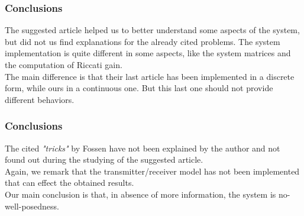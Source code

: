 \documentclass{beamer}
\begin{document}
		\begin{frame}
			\frametitle{Conclusions}
			The suggested article helped us to better understand some aspects of the system, but did not us find explanations for the already cited problems. The system implementation is quite different in some aspects, like the system matrices and the computation of Riccati gain.\\ The main difference is that their last article has been implemented in a discrete form, while ours in a continuous one. But this last one should not provide different behaviors.
		\end{frame}
		
		\begin{frame}
			\frametitle{Conclusions}
			The cited \textit{"tricks"} by Fossen have not been explained by the author and not found out during the studying of the suggested article.\\
			\vspace{0.3cm}
			Again, we remark that the transmitter/receiver model has not been implemented that can effect the obtained results.\\
			\vspace{0.3cm}
			Our main conclusion is that, in absence of more information, the system is no-well-posedness.
		\end{frame}
\end{document}
